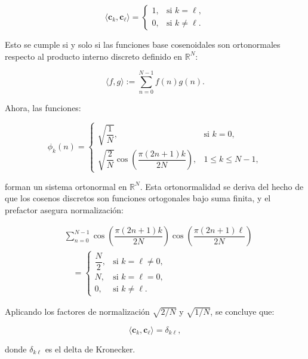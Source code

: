 \documentclass[8pt,a4paper]{article}
\theoremstyle{definition}
\theoremstyle{remark}
\begin{document}
\begin{multicols}{2}
            \[
            \langle \mathbf{c}_k, \mathbf{c}_\ell \rangle =
            \begin{cases}
            1, & \text{si } k = \ell, \\
            0, & \text{si } k \neq \ell.
            \end{cases}
            \]
            
            Esto se cumple si y solo si las funciones base cosenoidales son ortonormales respecto al producto interno discreto definido en \( \mathbb{R}^N \):
            
            \[
            \langle f, g \rangle := \sum_{n=0}^{N-1} f(n) g(n).
            \]
            
            Ahora, las funciones:
            
            \[
            \phi_k(n) = 
            \begin{cases}
            \sqrt{\dfrac{1}{N}}, & \text{si } k = 0, \\
            \sqrt{\dfrac{2}{N}} \cos\left( \dfrac{\pi(2n + 1)k}{2N} \right), & 1 \leq k \leq N-1,
            \end{cases}
            \]
            
            forman un sistema ortonormal en \( \mathbb{R}^N \). Esta ortonormalidad se deriva del hecho de que los cosenos discretos son funciones ortogonales bajo suma finita, y el prefactor asegura normalización:
            
            \begin{align*}
            &\sum_{n=0}^{N-1} \cos\left( \dfrac{\pi(2n + 1)k}{2N} \right) 
            \cos\left( \dfrac{\pi(2n + 1)\ell}{2N} \right) \\
            &\quad= 
            \begin{cases}
            \dfrac{N}{2}, & \text{si } k = \ell \neq 0, \\
            N, & \text{si } k = \ell = 0, \\
            0, & \text{si } k \neq \ell.
            \end{cases}
            \end{align*}
            
            Aplicando los factores de normalización \( \sqrt{2/N} \) y \( \sqrt{1/N} \), se concluye que:
            
            \[
            \langle \mathbf{c}_k, \mathbf{c}_\ell \rangle = \delta_{k\ell},
            \]
            
            donde \( \delta_{k\ell} \) es el delta de Kronecker.\\
            

\end{multicols}
\end{document}
